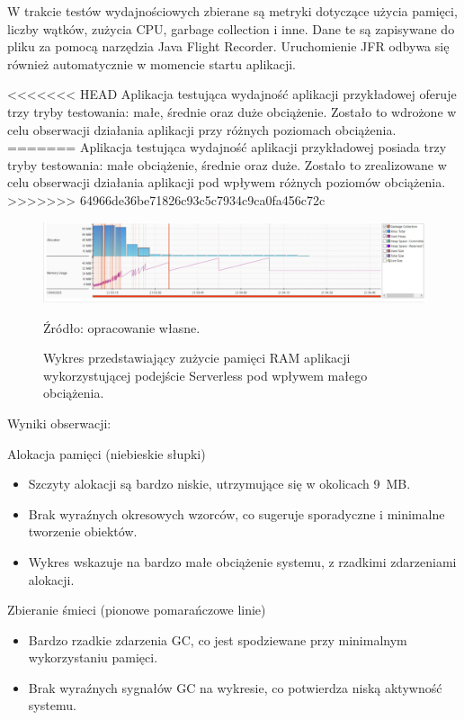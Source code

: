 \documentclass[runningheads,12pt]{llncs}
\begin{document}
W trakcie testów wydajnościowych zbierane są metryki dotyczące użycia pamięci, liczby wątków, zużycia CPU, garbage collection i inne. Dane te są zapisywane do pliku za pomocą narzędzia Java Flight Recorder. Uruchomienie JFR odbywa się również automatycznie w momencie startu aplikacji.

<<<<<<< HEAD
Aplikacja testująca wydajność aplikacji przykładowej oferuje trzy tryby testowania: małe, średnie oraz duże obciążenie. Zostało to wdrożone w celu obserwacji działania aplikacji przy różnych poziomach obciążenia.
=======
Aplikacja testująca wydajność aplikacji przykładowej posiada trzy tryby testowania: małe obciążenie, średnie oraz duże. Zostało to zrealizowane w celu obserwacji działania aplikacji pod wpływem różnych poziomów obciążenia.
>>>>>>> 64966de36be71826c93c5c7934c9ca0fa456c72c

\newpage

\begin{figure}
    \includegraphics[width=\linewidth]{images/serverless-memory-low-graph.jpg}
    \caption{Wykres przedstawiający zużycie pamięci RAM aplikacji wykorzystującej podejście Serverless pod wpływem małego obciążenia.} \label{fig1}
    \vspace{0.5em}
    {\small Źródło: opracowanie własne.}
\end{figure}

Wyniki obserwacji:

Alokacja pamięci (niebieskie słupki)

\begin{itemize}
    \item Szczyty alokacji są bardzo niskie, utrzymujące się w okolicach 9~MB.
    \item Brak wyraźnych okresowych wzorców, co sugeruje sporadyczne i minimalne tworzenie obiektów.
    \item Wykres wskazuje na bardzo małe obciążenie systemu, z rzadkimi zdarzeniami alokacji.
\end{itemize}

Zbieranie śmieci (pionowe pomarańczowe linie)

\begin{itemize}
    \item Bardzo rzadkie zdarzenia GC, co jest spodziewane przy minimalnym wykorzystaniu pamięci.
    \item Brak wyraźnych sygnałów GC na wykresie, co potwierdza niską aktywność systemu.
\end{itemize}
\end{document}
